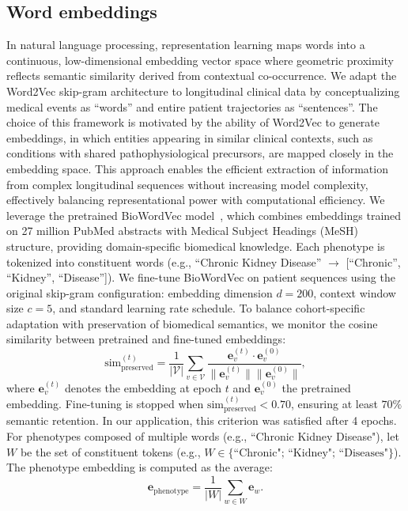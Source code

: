 \subsection{Word embeddings}\label{subsection:word_embedding}
In natural language processing, representation learning maps words into a continuous, low-dimensional embedding vector space where geometric proximity reflects semantic similarity derived from contextual co-occurrence. We adapt the Word2Vec skip-gram architecture to longitudinal clinical data by conceptualizing medical events as ``words'' and entire patient trajectories as ``sentences''. The choice of this framework is motivated by the ability of Word2Vec to generate embeddings, in which entities appearing in similar clinical contexts, such as conditions with shared pathophysiological precursors, are mapped closely in the embedding space. This approach enables the efficient extraction of information from complex longitudinal sequences without increasing model complexity, effectively balancing representational power with computational efficiency. We leverage the pretrained BioWordVec model~\citet{zhang2019biowordvec}, which combines embeddings trained on 27 million PubMed abstracts with Medical Subject Headings (MeSH) structure, providing domain-specific biomedical knowledge. Each phenotype is tokenized into constituent words (e.g., ``Chronic Kidney Disease'' $\rightarrow$ [``Chronic'', ``Kidney'', ``Disease'']). We fine-tune BioWordVec on patient sequences using the original skip-gram configuration: embedding dimension $d=200$, context window size $c=5$, and standard learning rate schedule. To balance cohort-specific adaptation with preservation of biomedical semantics, we monitor the cosine similarity between pretrained and fine-tuned embeddings:
\begin{equation}
\text{sim}_{\text{preserved}}^{(t)} = \frac{1}{|\mathcal{V}|} \sum_{v \in \mathcal{V}} \frac{\mathbf{e}_v^{(t)} \cdot \mathbf{e}_v^{(0)}}{\|\mathbf{e}_v^{(t)}\| \|\mathbf{e}_v^{(0)}\|},
\end{equation}
where $\mathbf{e}_v^{(t)}$ denotes the embedding at epoch $t$ and $\mathbf{e}_v^{(0)}$ the pretrained embedding. Fine-tuning is stopped when $\text{sim}_{\text{preserved}}^{(t)} < 0.70$, ensuring at least $70\%$ semantic retention. In our application, this criterion was satisfied after 4 epochs. For phenotypes composed of multiple words (e.g., ``Chronic Kidney Disease"), let $W$ be the set of constituent tokens (e.g., $W \in \{\text{``Chronic"; ``Kidney"; ``Diseases"}\}$). The phenotype embedding is computed as the average:
\begin{equation}
\mathbf{e}_{\text{phenotype}} = \frac{1}{|\text{$W$}|} \sum_{w \in \text{$W$}} \mathbf{e}_w.
\end{equation}


